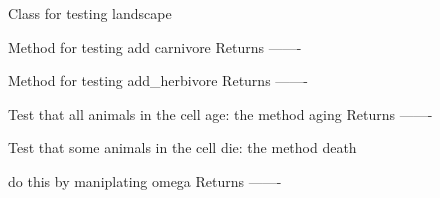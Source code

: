 \documentclass[a4paper,10pt,english]{sphinxmanual}
\begin{document}
\begin{fulllineitems}
\label{\detokenize{tests:biosim.tests.test_landscape.TestLandscape}}
Class for testing landscape

\begin{fulllineitems}
\label{\detokenize{tests:biosim.tests.test_landscape.TestLandscape.test_add_carnivores}}
Method for testing add carnivore
Returns
-------

\end{fulllineitems}


\begin{fulllineitems}
\label{\detokenize{tests:biosim.tests.test_landscape.TestLandscape.test_add_herbivore}}
Method for testing add\_herbivore
Returns
-------

\end{fulllineitems}


\begin{fulllineitems}
\label{\detokenize{tests:biosim.tests.test_landscape.TestLandscape.test_aging}}
Test that all animals in the cell age: the method aging
Returns
-------

\end{fulllineitems}


\begin{fulllineitems}
\label{\detokenize{tests:biosim.tests.test_landscape.TestLandscape.test_death}}
Test that some animals in the cell die: the method death

do this by maniplating omega
Returns
-------

\end{fulllineitems}



\end{fulllineitems}
\end{document}
